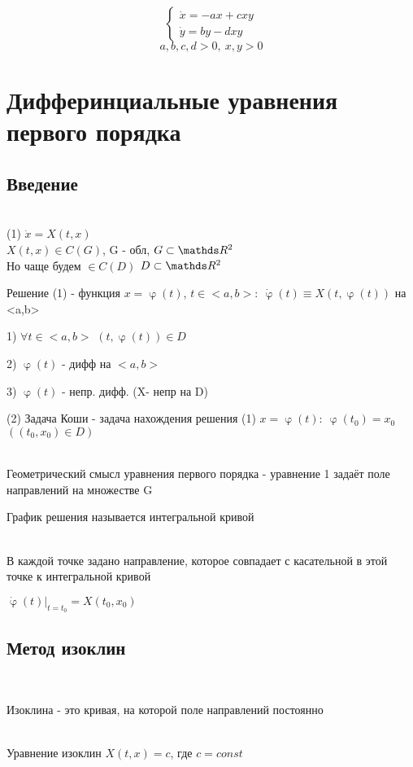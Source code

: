 \documentclass[11pt]{article}
\begin{document}
\begin{equation*}
 \begin{cases}
   \dot{x} = -ax+cxy\\
   \dot{y}=by-dxy
 \end{cases}
\end{equation*}
$$a,b,c,d > 0,\ x,y>0$$

\section{Дифферинциальные уравнения первого порядка}
\subsection{Введение}\ \\
(1) $\dot{x}=X(t,x)$
\\
$X(t,x) \in C(G)$, G - обл, $G \subset \R^2$
\\
Но чаще будем $\in C(D)$ $D \subset \R^2$

\begin{definition}
Решение (1) - функция $x=\upvarphi(t)$, $t \in <a,b>:\ \dot{\upvarphi}(t) \equiv X(t,\upvarphi(t))$ на <a,b>
\end{definition}

1) $\forall t \in <a,b>$ $(t, \upvarphi(t)) \in D$

2) $\upvarphi(t)$ - дифф на $<a,b>$

3) $\upvarphi(t)$ - непр. дифф. (X- непр на D)

\begin{definition}
(2) Задача Коши - задача нахождения решения (1) $x=\upvarphi(t):\ \upvarphi(t_0)=x_0$ $((t_0, x_0) \in D)$
\end{definition}
\\
Геометрический смысл уравнения первого порядка - уравнение 1 задаёт поле направлений на множестве G

\begin{definition}
График решения называется интегральной кривой
\end{definition}
\\
В каждой точке задано направление, которое совпадает с касательной в этой точке к интегральной кривой

$\dot{\upvarphi}(t) |_{t=t_0} = X(t_0, x_0)$
\\
\subsection{Метод изоклин}\
\begin{definition}
Изоклина - это кривая, на которой поле направлений постоянно
\end{definition}
\\
Уравнение изоклин $X(t,x)=c$, где $c=const$
\end{document}
